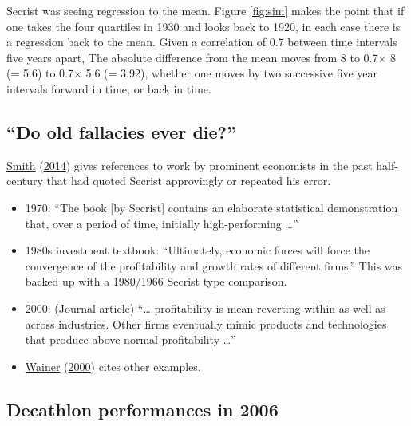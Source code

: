 \documentclass[
  10pt,
  b5paper]{book}
\providecommand{\tightlist}{%
  \setlength{\itemsep}{0pt}\setlength{\parskip}{0pt}}
\begin{document}
Secrist was seeing regression to the mean. Figure \ref{fig:sim}
makes the point that if one takes the four quartiles in 1930 and looks
back to 1920, in each case there is a regression back to the mean.
Given a correlation of 0.7 between time intervals five years apart,
The absolute difference from the mean moves from 8 to 0.7\(\times\) 8
(= 5.6) to 0.7\(\times\) 5.6 (= 3.92), whether one moves
by two successive five year intervals forward in time, or back in
time.

\hypertarget{do-old-fallacies-ever-die}{%
\subsection*{``Do old fallacies ever die?''}\label{do-old-fallacies-ever-die}}

\protect\hyperlink{ref-smith-sd}{Smith} (\protect\hyperlink{ref-smith-sd}{2014}) gives references to work by prominent economists in the past
half-century that had quoted Secrist approvingly or repeated his error.

\begin{itemize}
\tightlist
\item
  1970: ``The book {[}by Secrist{]} contains an elaborate statistical
  demonstration that, over a period of time, initially high-performing \ldots{}''
\item
  1980s investment textbook: ``Ultimately, economic forces will force
  the convergence of the profitability and growth rates of
  different firms.'' This was backed up with a 1980/1966
  Secrist type comparison.
\item
  2000: (Journal article) ``\ldots{} profitability is mean-reverting
  within as well as across industries. Other firms eventually
  mimic products and technologies that produce above normal
  profitability \ldots{}''
\item
  \protect\hyperlink{ref-wainerRegress}{Wainer} (\protect\hyperlink{ref-wainerRegress}{2000}) cites other examples.
\end{itemize}

\hypertarget{decathlon-performances-in-2006}{%
\subsection*{Decathlon performances in 2006}\label{decathlon-performances-in-2006}}
\end{document}
